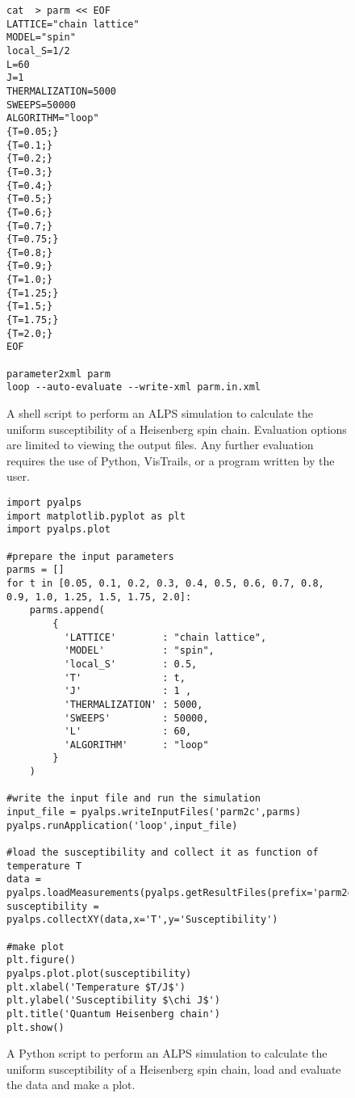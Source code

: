 \documentclass[12pt]{iopart}
\begin{document}
\begin{figure}
\begin{small}
\begin{verbatim}
cat  > parm << EOF
LATTICE="chain lattice"
MODEL="spin"
local_S=1/2
L=60
J=1
THERMALIZATION=5000
SWEEPS=50000
ALGORITHM="loop"
{T=0.05;}
{T=0.1;}
{T=0.2;}
{T=0.3;}
{T=0.4;}
{T=0.5;}
{T=0.6;}
{T=0.7;}
{T=0.75;}
{T=0.8;}
{T=0.9;}
{T=1.0;}
{T=1.25;}
{T=1.5;}
{T=1.75;}
{T=2.0;}
EOF

parameter2xml parm
loop --auto-evaluate --write-xml parm.in.xml
\end{verbatim}
\end{small}
\caption{A shell script to perform an ALPS simulation to calculate the uniform susceptibility of a Heisenberg spin chain. Evaluation options are limited to viewing the output files. Any further evaluation requires the use of Python, VisTrails, or a program written by the user.}
\label{fig:commandline}
\end{figure}


\begin{figure}
\begin{small}
\begin{verbatim}
import pyalps
import matplotlib.pyplot as plt
import pyalps.plot

#prepare the input parameters
parms = []
for t in [0.05, 0.1, 0.2, 0.3, 0.4, 0.5, 0.6, 0.7, 0.8, 0.9, 1.0, 1.25, 1.5, 1.75, 2.0]:
    parms.append(
        { 
          'LATTICE'        : "chain lattice", 
          'MODEL'          : "spin",
          'local_S'        : 0.5,
          'T'              : t,
          'J'              : 1 ,
          'THERMALIZATION' : 5000,
          'SWEEPS'         : 50000,
          'L'              : 60,
          'ALGORITHM'      : "loop"
        }
    )

#write the input file and run the simulation
input_file = pyalps.writeInputFiles('parm2c',parms)
pyalps.runApplication('loop',input_file)

#load the susceptibility and collect it as function of temperature T
data = pyalps.loadMeasurements(pyalps.getResultFiles(prefix='parm2c'),'Susceptibility')
susceptibility = pyalps.collectXY(data,x='T',y='Susceptibility')

#make plot
plt.figure()
pyalps.plot.plot(susceptibility)
plt.xlabel('Temperature $T/J$')
plt.ylabel('Susceptibility $\chi J$')
plt.title('Quantum Heisenberg chain')
plt.show()
\end{verbatim}
\end{small}
\caption{A Python script to perform an ALPS simulation to calculate the uniform susceptibility of a Heisenberg spin chain, load and evaluate the data and make a plot. }
\label{fig:python}
\end{figure}
\end{document}
